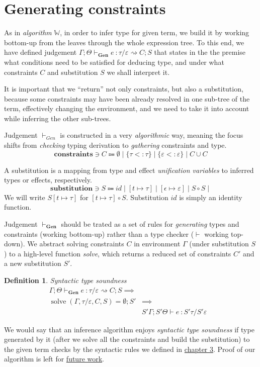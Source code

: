 \documentclass[declaration,shortabstract]{iithesis}
\newtheorem{definition}{Definition}[section]
\newcommand{\types}[4][\Gamma;\Theta]{\ensuremath{{{#1} \vdash {#2} \: : {#3}/{#4}}}}
\newcommand{\gens}[6][\Gamma;\Theta]{\ensuremath{{{#1} \vdash_\textbf{Gen} {#2} \: : {#3}/{#4}} \rightsquigarrow {#5};{#6}}}
\begin{document}
\section{Generating constraints}
As in \textit{algorithm} $\mathbb{W}$, in order to infer type for given term,
we build it by working bottom-up from the leaves through the whole expression tree.
To this end, we have defined judgement $\gens{e}{\tau}{\varepsilon}{C}{S}$ that
states in the the premise what conditions need to be satisfied for deducing type, 
and under what constraints $C$ and substitution $S$ we shall interpret it.

It is important that we ``return'' not only constraints, but also a substitution, 
because some constraints may have been already resolved in
one sub-tree of the term, effectively changing the environment,
and we need to take it into account while inferring the other sub-trees.

Judgement $\vdash_{Gen}$ is constructed in a very \textit{algorithmic} way, meaning the focus shifts from \textit{checking} typing derivation to \textit{gathering} constraints and type.
$$
 \textbf{constraints} \ni C \Coloneqq
    \emptyset \mid \{\tau <: \tau\} \mid \{\varepsilon <: \varepsilon\} \mid C \cup C 
$$

A substitution is a mapping from type and effect \textit{unification variables} to
inferred types or effects, respectively.
$$
 \textbf{substitution} \ni S \Coloneqq
    {id} \mid [t \mapsto \tau] \mid [\epsilon \mapsto \varepsilon] \mid S \circ S \mid 
$$
We will write $S[t \mapsto \tau]$ for $[t\mapsto \tau] \circ S$.
Substitution $id$ is simply an identity function.

Judgement  $\vdash_\textbf{Gen}$ should be trated as a set of rules for
\textit{generating} types and constraints (working bottom-up) rather than
a type checker ($\vdash$ working top-down).
We abstract solving constraints $C$ in environment $\Gamma$ (under substitution $S$) to
a high-level function \textit{solve}, which returns a reduced set of constraints $C'$ and
a new substitution $S'$. 

\begin{definition}{Syntactic type soundness}
   $$
   \begin{aligned}
    \gens{e}{\tau}{\varepsilon}{C}{S} \implies& &\\
    \operatorname{solve}(\Gamma,\tau/\varepsilon, C, S) = \emptyset; S' & \implies & \\
      &\types[S'\Gamma;S'\Theta]{e}{S'\tau}{S'\varepsilon} &
    \end{aligned}
    $$
\end{definition}
We would say that an inference algorithm enjoys \textit{syntactic type soundness}
if type generated by it (after we solve all the constraints and build the substitution)
to the given term checks by the syntactic rules we defined in \hyperlink{chapter.3}{chapter 3}.
Proof of our algorithm is left for \hyperlink{chapter.6}{future work}.
\end{document}
